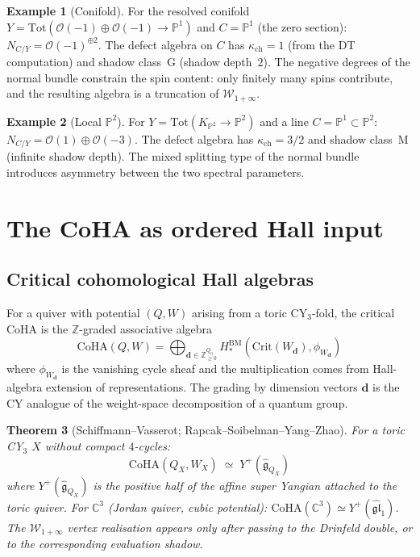 \documentclass[11pt]{article}
\theoremstyle{plain}
\newtheorem{theorem}{Theorem}[section]
\theoremstyle{definition}
\newtheorem{example}[theorem]{Example}
\theoremstyle{remark}
\newcommand{\fg}{\mathfrak{g}}
\newcommand{\fgl}{\mathfrak{gl}}
\newcommand{\cO}{\mathcal{O}}
\newcommand{\cW}{\mathcal{W}}
\newcommand{\bC}{\mathbb{C}}
\newcommand{\bP}{\mathbb{P}}
\newcommand{\bZ}{\mathbb{Z}}
\newcommand{\CoHA}{\mathrm{CoHA}}
\begin{document}
\begin{example}[Conifold]
\label{ex:v3-qg-conifold-defect}
For the resolved conifold $Y = \mathrm{Tot}(\cO(-1) \oplus
\cO(-1) \to \bP^1)$ and $C = \bP^1$ (the zero section):
$N_{C/Y} = \cO(-1)^{\oplus 2}$.  The defect algebra on $C$ has
$\kappa_{\mathrm{ch}} = 1$ (from the DT computation) and shadow
class~G (shadow depth~$2$).  The negative degrees of the normal
bundle constrain the spin content: only finitely many spins
contribute, and the resulting algebra is a truncation of
$\cW_{1+\infty}$.
\end{example}

\begin{example}[Local $\bP^2$]
\label{ex:v3-qg-local-p2-defect}
For $Y = \mathrm{Tot}(K_{\bP^2} \to \bP^2)$ and a line
$C = \bP^1 \subset \bP^2$:
$N_{C/Y} = \cO(1) \oplus \cO(-3)$.  The defect algebra has
$\kappa_{\mathrm{ch}} = 3/2$ and shadow class~M (infinite shadow
depth).  The mixed splitting type of the normal bundle introduces
asymmetry between the two spectral parameters.
\end{example}



\section{The CoHA as ordered Hall input}
\label{sec:coha-e1}

\subsection{Critical cohomological Hall algebras}

For a quiver with potential $(Q, W)$ arising from a toric
CY$_3$-fold, the critical CoHA is the $\bZ$-graded associative
algebra
\[
 \CoHA(Q, W)
 = \bigoplus_{\mathbf{d} \in \bZ_{\geq 0}^{Q_0}}
 H^{\mathrm{BM}}_*(\mathrm{Crit}(W_\mathbf{d}),
 \phi_{W_\mathbf{d}})
\]
where $\phi_{W_\mathbf{d}}$ is the vanishing cycle sheaf and the
multiplication comes from Hall-algebra extension of representations.
The grading by dimension vectors $\mathbf{d}$ is the CY analogue of
the weight-space decomposition of a quantum group.

\begin{theorem}[Schiffmann--Vasserot; Rapcak--Soibelman--Yang--Zhao]
\label{thm:v3-qg-coha-yangian}
For a toric CY$_3$ $X$ without compact $4$-cycles:
\[
 \CoHA(Q_X, W_X) \;\simeq\; Y^+(\widehat{\fg}_{Q_X})
\]
where $Y^+(\widehat{\fg}_{Q_X})$ is the positive half of the
affine super Yangian attached to the toric quiver.  For $\bC^3$
(Jordan quiver, cubic potential):
$\CoHA(\bC^3) \simeq Y^+(\widehat{\fgl}_1)$. The
$\cW_{1+\infty}$ vertex realisation appears only after passing to
the Drinfeld double, or to the corresponding evaluation shadow.
\end{theorem}
\end{document}
